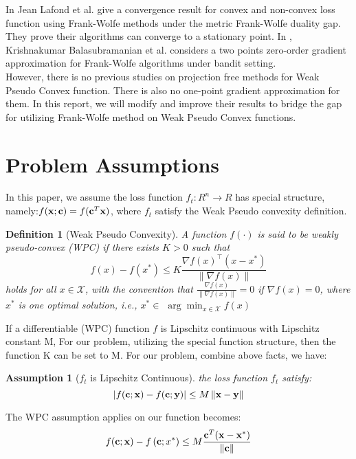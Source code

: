 \documentclass[12pt]{article}
\newtheorem{definition}{Definition}
\newtheorem{assumption}{Assumption}
\begin{document}
In \cite{lafond2015online} Jean Lafond et al. give a convergence result for convex and non-convex loss function using Frank-Wolfe methods under the metric Frank-Wolfe duality gap. They prove their algorithms can converge to a stationary point. In \cite{balasubramanian2019zerothorder}, Krishnakumar Balasubramanian et al. considers a two points zero-order gradient approximation for Frank-Wolfe algorithms under bandit setting. \\
However, there is no previous studies on projection free methods for Weak Pseudo Convex function. There is also no one-point gradient approximation for them. In this report, we will modify and improve their results to bridge the gap for utilizing Frank-Wolfe method on Weak Pseudo Convex functions.
\section{Problem Assumptions}
In this paper, we assume the loss function $f_t:R^n \rightarrow R$ has special structure, namely:$f(\bold{x};\bold{c})=f(\bold{c}^T\bold{x})$, where $f_t$ satisfy the Weak Pseudo convexity definition.
\begin{definition}[Weak Pseudo Convexity]
A function $f(\cdot)$ is said to be weakly pseudo-convex (WPC) if there exists $K>0$ such that
$$
f(x)-f\left(x^*\right) \leq K \frac{\nabla f(x)^{\top}\left(x-x^*\right)}{\|\nabla f(x)\|}
$$
holds for all $x \in \mathcal{X}$, with the convention that $\frac{\nabla f(x)}{\|\nabla f(x)\|}=0$ if $\nabla f(x)=0$, where $x^*$ is one optimal solution, i.e., $x^* \in$ $\arg \min _{x \in \mathcal{X}} f(x)$
\end{definition}
If a differentiable (WPC) function $f$ is Lipschitz continuous with Lipschitz constant M, 
For our problem, utilizing the special function structure, then the function K can be set to M.
For our problem, combine above facts, we have:
\begin{assumption}[$f_t$ is Lipschitz Continuous]
the loss function $f_t$ satisfy:
\begin{equation}
    \left |  f(\bold{c};\bold{x})-f(\bold{c};\bold{y})  \right | \leq M \left \| \bold{x}-\bold{y} \right \|
\end{equation}
\end{assumption}
The WPC assumption applies on our function becomes:
\begin{equation}
f(\bold{c};\bold{x})-f\left(\bold{c};x^*\right) \leq  M \frac{\bold{c}^T(\bold{x}-\bold{x^*})}{\left \| \bold{c} \right \|}
\end{equation}
\end{document}
